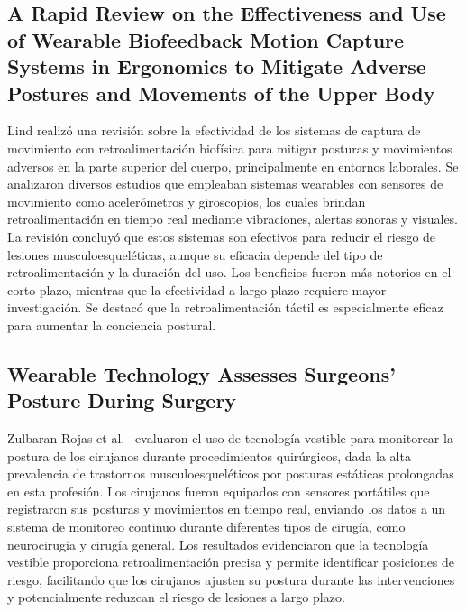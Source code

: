 \documentclass[manuscript,screen,review]{acmart}
\begin{document}
\subsection{A Rapid Review on the Effectiveness and Use of Wearable Biofeedback Motion Capture Systems in Ergonomics to Mitigate Adverse Postures and Movements of the Upper Body}
Lind \cite{lind2024rapid} realizó una revisión sobre la efectividad de los sistemas de captura de movimiento con retroalimentación biofísica para mitigar posturas y movimientos adversos en la parte superior del cuerpo, principalmente en entornos laborales. Se analizaron diversos estudios que empleaban sistemas wearables con sensores de movimiento como acelerómetros y giroscopios, los cuales brindan retroalimentación en tiempo real mediante vibraciones, alertas sonoras y visuales. La revisión concluyó que estos sistemas son efectivos para reducir el riesgo de lesiones musculoesqueléticas, aunque su eficacia depende del tipo de retroalimentación y la duración del uso. Los beneficios fueron más notorios en el corto plazo, mientras que la efectividad a largo plazo requiere mayor investigación. Se destacó que la retroalimentación táctil es especialmente eficaz para aumentar la conciencia postural.

\subsection{Wearable Technology Assesses Surgeons' Posture During Surgery}
Zulbaran-Rojas et al.\ \cite{zulbaran2023wearable} evaluaron el uso de tecnología vestible para monitorear la postura de los cirujanos durante procedimientos quirúrgicos, dada la alta prevalencia de trastornos musculoesqueléticos por posturas estáticas prolongadas en esta profesión. Los cirujanos fueron equipados con sensores portátiles que registraron sus posturas y movimientos en tiempo real, enviando los datos a un sistema de monitoreo continuo durante diferentes tipos de cirugía, como neurocirugía y cirugía general. Los resultados evidenciaron que la tecnología vestible proporciona retroalimentación precisa y permite identificar posiciones de riesgo, facilitando que los cirujanos ajusten su postura durante las intervenciones y potencialmente reduzcan el riesgo de lesiones a largo plazo.
\end{document}
